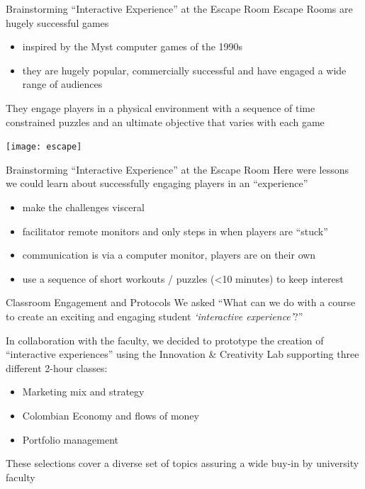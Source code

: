 \documentclass[
  ignorenonframetext,
]{beamer}
\providecommand{\tightlist}{%
  \setlength{\itemsep}{0pt}\setlength{\parskip}{0pt}}
\begin{document}
\begin{frame}{Brainstorming ``Interactive Experience'' at the Escape
Room}
\label{brainstorming-interactive-experience-at-the-escape-room}
Escape Rooms are hugely successful games

\begin{itemize}
\tightlist
\item
  inspired by the Myst computer games of the 1990s
\item
  they are hugely popular, commercially successful and have engaged a
  wide range of audiences
\end{itemize}

They engage players in a physical environment with a sequence of time
constrained puzzles and an ultimate objective that varies with each game

\begin{flushleft}\texttt{[image: escape]} \end{flushleft}
\end{frame}

\begin{frame}{Brainstorming ``Interactive Experience'' at the Escape
Room}
\label{brainstorming-interactive-experience-at-the-escape-room-1}
Here were lessons we could learn about successfully engaging players in
an ``experience''

\begin{itemize}
\tightlist
\item
  make the challenges visceral
\item
  facilitator remote monitors and only steps in when players are
  ``stuck''
\item
  communication is via a computer monitor, players are on their own
\item
  use a sequence of short workouts / puzzles (\textless10 minutes) to
  keep interest
\end{itemize}
\end{frame}

\begin{frame}{Classroom Engagement and Protocols}
\label{classroom-engagement-and-protocols}
We asked ``What can we do with a course to create an exciting and
engaging student \emph{`interactive experience'}?''

In collaboration with the faculty, we decided to prototype the creation
of ``interactive experiences'' using the Innovation \& Creativity Lab
supporting three different 2-hour classes:

\begin{itemize}
\tightlist
\item
  Marketing mix and strategy
\item
  Colombian Economy and flows of money
\item
  Portfolio management
\end{itemize}

These selections cover a diverse set of topics assuring a wide buy-in by
university faculty
\end{frame}
\end{document}
